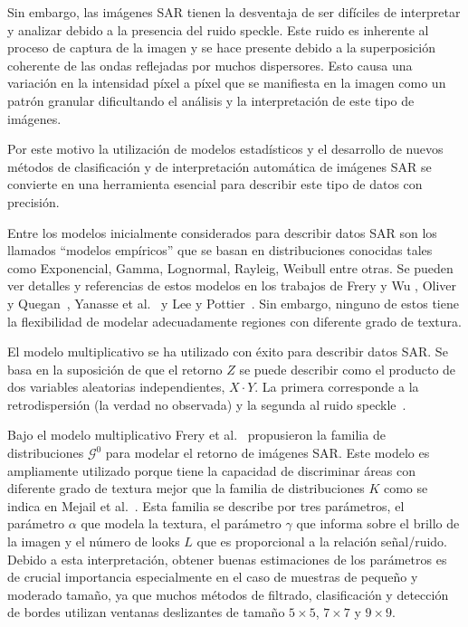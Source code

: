 \documentclass[12pt]{article}
\begin{document}
Sin embargo, las imágenes SAR tienen la desventaja de ser difíciles de interpretar y analizar debido a la presencia del ruido speckle. Este ruido es inherente al proceso de captura de la imagen y se hace presente debido a la superposición coherente de las ondas reflejadas por
muchos dispersores. Esto causa una variación en la intensidad píxel a píxel que se manifiesta en la imagen como un patrón granular dificultando el análisis y la interpretación de este tipo de imágenes. 

Por este motivo la utilización de modelos estadísticos y el desarrollo de nuevos métodos de clasificación y de interpretación automática de imágenes SAR se convierte en una herramienta esencial para describir este tipo de datos con precisión.

Entre los modelos inicialmente considerados para describir datos SAR son los llamados ``modelos empíricos'' que se basan en distribuciones conocidas tales como Exponencial, Gamma, Lognormal, Rayleig, Weibull entre otras. Se pueden ver detalles y referencias de estos modelos en los trabajos de Frery y Wu \cite{FreryLibro2019}, Oliver y Quegan~\cite{oliverquegan98}, Yanasse et al.~\cite{Yanasse93} y Lee y Pottier~\cite{Lee2009}. 
Sin embargo, ninguno de estos tiene la flexibilidad de modelar adecuadamente regiones con diferente grado de textura.

El modelo multiplicativo se ha utilizado con éxito para describir datos SAR. Se basa en la suposición de que el retorno $Z$ se puede describir como el producto de dos variables aleatorias independientes, $X\cdot Y$. La primera corresponde a la retrodispersión (la verdad no observada) y la segunda al ruido speckle~\cite{oliverquegan98}.

Bajo el modelo multiplicativo Frery et al.~\cite{Frery97} propusieron la familia de distribuciones $\mathcal{G}^0$ para modelar el retorno de imágenes SAR. Este modelo es ampliamente utilizado porque tiene la capacidad de discriminar áreas con diferente grado de textura mejor que la familia de distribuciones $K$ como se indica en Mejail et al.~\cite{MejailJacoboFreryBustos:IJRS}.
Esta familia se describe por tres parámetros, el parámetro $\alpha$ que modela la textura, el parámetro $\gamma$ que informa sobre el brillo de la imagen y el número de looks $L$ que es proporcional a la relación señal/ruido. 
Debido a esta interpretación, obtener buenas estimaciones de los parámetros es de crucial importancia especialmente en el caso de muestras de pequeño y moderado tamaño, ya que muchos métodos de filtrado, clasificación y detección de bordes utilizan ventanas deslizantes de tamaño $5 \times 5$, $7 \times 7$ y $9 \times 9$.
\end{document}

